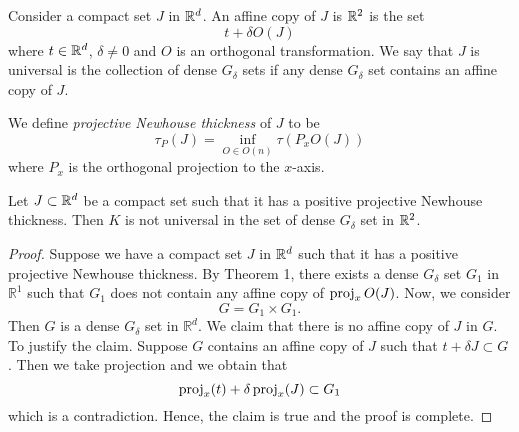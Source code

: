 Consider a compact set $J$ in $\mathbb{R}^d$. An affine copy of $J$ is $\mathbb{R}^2$ is the set 
$$
t+\delta O (J)
$$
where $t\in \mathbb{R}^d$, $\delta\ne 0$ and $O$ is an orthogonal transformation. We say that $J$ is universal is the collection of dense $G_{\delta}$ sets if any dense $G_{\delta}$ set contains an affine copy of $J$. 

\begin{definition}
    We define {\it projective Newhouse thickness} of $J$ to be 
$$
\tau_P(J) = \inf_{O\in O (n)} \tau(P_xO(J))
$$
where $P_x$ is the orthogonal projection to the $x$-axis. 
\end{definition}

\begin{theorem}Let $J \subset \mathbb{R}^d$ be a compact set such that it has a positive projective Newhouse thickness. Then $K$ is not universal in the set of dense $G_\delta$ set in $\mathbb{R}^2$.  
\end{theorem}

\begin{proof}  Suppose we have a compact set $J$ in $\mathbb{R}^d$ such that it has a positive projective Newhouse thickness.  By Theorem 1, there exists a dense $G_{\delta}$ set $G_1$ in ${\mathbb R}^1$ such that $G_1$ does not contain any  affine copy of $\operatorname{proj}_x O(J)$. Now, we consider 
$$
G = G_1\times G_1. 
$$
Then $G$ is a dense $G_{\delta}$ set in ${\mathbb R}^d$. We claim that there is no affine copy of $J$ in $G$. To justify the claim. Suppose $G$ contains an affine copy of $J$ such that $t+\delta J\subset G$.  Then we take projection and we obtain that
$$
\operatorname{proj}_x(t)+ \delta \operatorname{proj}_x (J) \subset G_1
$$
which is a contradiction. Hence, the claim is true and the proof is complete. 





\end{proof}